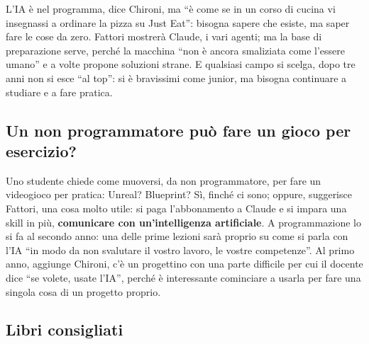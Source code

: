 L'IA è nel programma, dice Chironi, ma ``è come se in un corso di cucina vi
insegnassi a ordinare la pizza su Just Eat'': bisogna sapere che esiste, ma
saper fare le cose da zero. Fattori mostrerà Claude, i vari agenti; ma la base
di preparazione serve, perché la macchina ``non è ancora smaliziata come
l'essere umano'' e a volte propone soluzioni strane. E qualsiasi campo si
scelga, dopo tre anni non si esce ``al top'': si è bravissimi come junior, ma
bisogna continuare a studiare e a fare pratica.

\subsection{Un non programmatore può fare un gioco per esercizio?}

Uno studente chiede come muoversi, da non programmatore, per fare un
videogioco per pratica: Unreal? Blueprint? Sì, finché ci sono; oppure, suggerisce
Fattori, una cosa molto utile: si paga l'abbonamento a Claude e si impara una
skill in più, \textbf{comunicare con un'intelligenza artificiale}. A
programmazione lo si fa al secondo anno: una delle prime lezioni sarà proprio
su come si parla con l'IA ``in modo da non svalutare il vostro lavoro, le
vostre competenze''. Al primo anno, aggiunge Chironi, c'è un progettino con una
parte difficile per cui il docente dice ``se volete, usate l'IA'', perché è
interessante cominciare a usarla per fare una singola cosa di un progetto
proprio.

\subsection{Libri consigliati}

